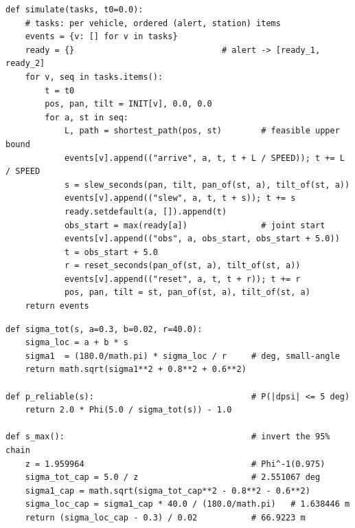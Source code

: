 \begin{lstlisting}[caption={Q2(2)/Q4: event-timeline simulator core (joint start =
max readiness; shared by both questions, replayed from captured states in Q4;
AI-assisted implementation).},label={lst:sim}]
def simulate(tasks, t0=0.0):
    # tasks: per vehicle, ordered (alert, station) items
    events = {v: [] for v in tasks}
    ready = {}                              # alert -> [ready_1, ready_2]
    for v, seq in tasks.items():
        t = t0
        pos, pan, tilt = INIT[v], 0.0, 0.0
        for a, st in seq:
            L, path = shortest_path(pos, st)        # feasible upper bound
            events[v].append(("arrive", a, t, t + L / SPEED)); t += L / SPEED
            s = slew_seconds(pan, tilt, pan_of(st, a), tilt_of(st, a))
            events[v].append(("slew", a, t, t + s)); t += s
            ready.setdefault(a, []).append(t)
            obs_start = max(ready[a])               # joint start
            events[v].append(("obs", a, obs_start, obs_start + 5.0))
            t = obs_start + 5.0
            r = reset_seconds(pan_of(st, a), tilt_of(st, a))
            events[v].append(("reset", a, t, t + r)); t += r
            pos, pan, tilt = st, pan_of(st, a), tilt_of(st, a)
    return events
\end{lstlisting}

\begin{lstlisting}[caption={Q3: pointing-error propagation chain and the inverse
$s_{\max}$ (AI-assisted implementation).},label={lst:q3}]
def sigma_tot(s, a=0.3, b=0.02, r=40.0):
    sigma_loc = a + b * s
    sigma1  = (180.0/math.pi) * sigma_loc / r     # deg, small-angle
    return math.sqrt(sigma1**2 + 0.8**2 + 0.6**2)

def p_reliable(s):                                # P(|dpsi| <= 5 deg)
    return 2.0 * Phi(5.0 / sigma_tot(s)) - 1.0

def s_max():                                      # invert the 95% chain
    z = 1.959964                                  # Phi^-1(0.975)
    sigma_tot_cap = 5.0 / z                       # 2.551067 deg
    sigma1_cap = math.sqrt(sigma_tot_cap**2 - 0.8**2 - 0.6**2)
    sigma_loc_cap = sigma1_cap * 40.0 / (180.0/math.pi)   # 1.638446 m
    return (sigma_loc_cap - 0.3) / 0.02           # 66.9223 m
\end{lstlisting}

